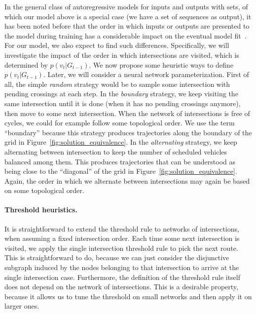 \documentclass[a4paper]{article}
\theoremstyle{definition}
\theoremstyle{plain}
\begin{document}
In the general class of autoregressive models for inputs and outputs with sets,
of which our model above is a special case (we have a set of sequences as
output), it has been noted before that the order in which inputs or outputs are
presented to the model during training has a considerable impact on the eventual
model fit~\cite{vinyalsOrderMattersSequence2016}.
%
For our model, we also expect to find such differences. Specifically, we will
investigate the impact of the order in which intersections are visited, which is
determined by $p(v_{t} | G_{t-1})$. We now propose some heuristic ways to define
$p(v_{t} | G_{t-1})$. Later, we will consider a neural network parameterization.
First of all, the simple \textit{random} strategy would be to sample some
intersection with pending crossings at each step.
In the \textit{boundary} strategy, we keep visiting the same intersection until
it is done (when it has no pending crossings anymore), then move to some next
intersection. When the network of intersections is free of cycles, we could for
example follow some topological order. We use the term ``boundary'' because this
strategy produces trajectories along the boundary of the grid in
Figure~\ref{fig:solution_equivalence}.
In the \textit{alternating} strategy, we keep alternating between intersection to keep
the number of scheduled vehicles balanced among them. This produces trajectories
that can be understood as being close to the ``diagonal'' of the grid in
Figure~\ref{fig:solution_equivalence}. Again, the order in which we alternate between intersections may
again be based on some topological order.


\paragraph{Threshold heuristics.}
It is straightforward to extend the threshold rule to networks of
intersections, when assuming a fixed intersection order. Each time some
next intersection is visited, we apply the single intersection threshold rule to
pick the next route. This is straightforward to do, because we can just consider
the disjunctive subgraph induced by the nodes belonging to that intersection to
arrive at the single intersection case.
%
Furthermore, the definition of the threshold rule itself does not depend on the
network of intersections. This is a desirable property, because it allows us to
tune the threshold on small networks and then apply it on larger ones.
\end{document}

